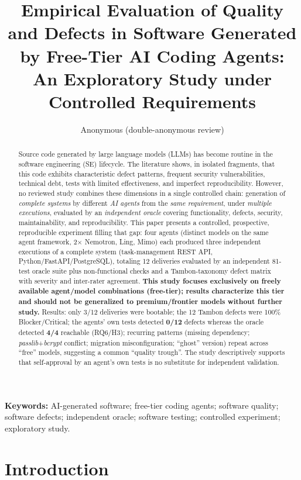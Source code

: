 \documentclass[10pt,twocolumn]{article}
\title{Empirical Evaluation of Quality and Defects in Software Generated by Free-Tier AI Coding Agents: An Exploratory Study under Controlled Requirements}
\author{Anonymous (double-anonymous review)}
\date{}
\begin{document}
\maketitle

\begin{abstract}
Source code generated by large language models (LLMs) has become routine in the software engineering (SE) lifecycle. The literature shows, in isolated fragments, that this code exhibits characteristic defect patterns, frequent security vulnerabilities, technical debt, tests with limited effectiveness, and imperfect reproducibility. However, no reviewed study combines these dimensions in a single controlled chain: generation of \emph{complete systems} by different \emph{AI agents} from the \emph{same requirement}, under \emph{multiple executions}, evaluated by an \emph{independent oracle} covering functionality, defects, security, maintainability, and reproducibility. This paper presents a controlled, prospective, reproducible experiment filling that gap: four agents (distinct models on the same agent framework, 2$\times$ Nemotron, Ling, Mimo) each produced three independent executions of a complete system (task-management REST API, Python/FastAPI/PostgreSQL), totaling 12 deliveries evaluated by an independent 81-test oracle suite plus non-functional checks and a Tambon-taxonomy defect matrix with severity and inter-rater agreement. \textbf{This study focuses exclusively on freely available agent/model combinations (free-tier); results characterize this tier and should not be generalized to premium/frontier models without further study.} Results: only 3/12 deliveries were bootable; the 12 Tambon defects were 100\% Blocker/Critical; the agents' own tests detected \textbf{0/12} defects whereas the oracle detected \textbf{4/4} reachable (RQ6/H3); recurring patterns (missing dependency; \emph{passlib}+\emph{bcrypt} conflict; migration misconfiguration; ``ghost'' version) repeat across ``free'' models, suggesting a common ``quality trough''. The study descriptively supports that self-approval by an agent's own tests is no substitute for independent validation.
\end{abstract}

\noindent\textbf{Keywords:} AI-generated software; free-tier coding agents; software quality; software defects; independent oracle; software testing; controlled experiment; exploratory study.

\section{Introduction}
\end{document}
